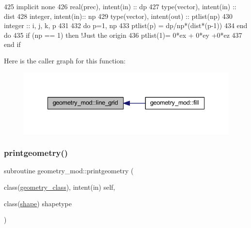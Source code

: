 \begin{DoxyCode}
425     \textcolor{keywordtype}{implicit none}
426     \textcolor{keywordtype}{real(prec)}, \textcolor{keywordtype}{intent(in)} :: dp
427     \textcolor{keywordtype}{type}(vector), \textcolor{keywordtype}{intent(in)} :: dist
428     \textcolor{keywordtype}{integer}, \textcolor{keywordtype}{intent(in)}::  np
429     \textcolor{keywordtype}{type}(vector), \textcolor{keywordtype}{intent(out)} :: ptlist(np)
430     \textcolor{keywordtype}{integer} :: i, j, k, p
431 
432     \textcolor{keywordflow}{do} p=1, np
433         ptlist(p) = dp/np*(dist*(p-1))
434 \textcolor{keywordflow}{    end do}
435     \textcolor{keywordflow}{if} (np == 1) \textcolor{keywordflow}{then} \textcolor{comment}{!Just the origin}
436         ptlist(1)= 0*ex + 0*ey +0*ez
437 \textcolor{keywordflow}{    end if}
\end{DoxyCode}
Here is the caller graph for this function\+:\nopagebreak
\begin{figure}[H]
\begin{center}
\leavevmode
\includegraphics[width=335pt]{namespacegeometry__mod_abcb09c0f5274c27cb79b0dd009ed94b3_icgraph}
\end{center}
\end{figure}
\mbox{\label{namespacegeometry__mod_aed4426181ca851b41717edd50268e5f3}} 
\subsubsection{\texorpdfstring{printgeometry()}{printgeometry()}}
{\footnotesize\ttfamily subroutine geometry\+\_\+mod\+::printgeometry (\begin{DoxyParamCaption}\item[{class(\mbox{\hyperlink{structgeometry__mod_1_1geometry__class}{geometry\+\_\+class}}), intent(in)}]{self,  }\item[{class(\mbox{\hyperlink{structgeometry__mod_1_1shape}{shape}})}]{shapetype }\end{DoxyParamCaption})\hspace{0.3cm}{\ttfamily [private]}}



